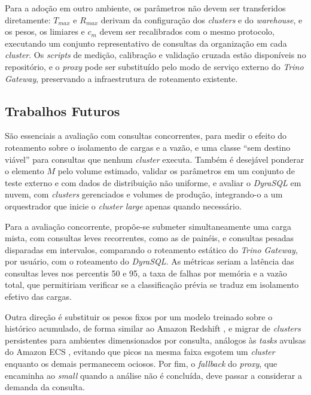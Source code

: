 Para a adoção em outro ambiente, os parâmetros não devem ser transferidos diretamente: $T_{max}$ e $R_{max}$ derivam da configuração dos \textit{clusters} e do \textit{warehouse}, e os pesos, os limiares e $c_m$ devem ser recalibrados com o mesmo protocolo, executando um conjunto representativo de consultas da organização em cada \textit{cluster}. Os \textit{scripts} de medição, calibração e validação cruzada estão disponíveis no repositório, e o \textit{proxy} pode ser substituído pelo modo de serviço externo do \textit{Trino Gateway}, preservando a infraestrutura de roteamento existente.

\subsection{Trabalhos Futuros}

São essenciais a avaliação com consultas concorrentes, para medir o efeito do roteamento sobre o isolamento de cargas e a vazão, e uma classe ``sem destino viável'' para consultas que nenhum \textit{cluster} executa. Também é desejável ponderar o elemento $M$ pelo volume estimado, validar os parâmetros em um conjunto de teste externo e com dados de distribuição não uniforme, e avaliar o \textit{DyraSQL} em nuvem, com \textit{clusters} gerenciados e volumes de produção, integrando-o a um orquestrador que inicie o \textit{cluster large} apenas quando necessário.

Para a avaliação concorrente, propõe-se submeter simultaneamente uma carga mista, com consultas leves recorrentes, como as de painéis, e consultas pesadas disparadas em intervalos, comparando o roteamento estático do \textit{Trino Gateway}, por usuário, com o roteamento do \textit{DyraSQL}. As métricas seriam a latência das consultas leves nos percentis 50 e 95, a taxa de falhas por memória e a vazão total, que permitiriam verificar se a classificação prévia se traduz em isolamento efetivo das cargas.

Outra direção é substituir os pesos fixos por um modelo treinado sobre o histórico acumulado, de forma similar ao Amazon Redshift \cite{ding2024}, e migrar de \textit{clusters} persistentes para ambientes dimensionados por consulta, análogos às \textit{tasks} avulsas do Amazon ECS \cite{awsecs2025}, evitando que picos na mesma faixa esgotem um \textit{cluster} enquanto os demais permanecem ociosos. Por fim, o \textit{fallback} do \textit{proxy}, que encaminha ao \textit{small} quando a análise não é concluída, deve passar a considerar a demanda da consulta.
